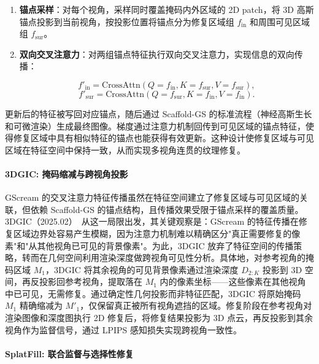 \begin{enumerate}
\item \textbf{锚点采样}：对每个视角，采样同时覆盖掩码内外区域的 2D patch，将 3D 高斯锚点投影到当前视角，按投影位置将锚点分为修复区域组 $f_{\text{in}}$ 和周围可见区域组 $f_{\text{sur}}$。
\item \textbf{双向交叉注意力}：对两组锚点特征执行双向交叉注意力，实现信息的双向传播：

\begin{equation}
f'_{\text{in}} = \text{CrossAttn}(Q=f_{\text{in}}, K=f_{\text{sur}}, V=f_{\text{sur}}),
\end{equation}
\begin{equation}
f'_{\text{sur}} = \text{CrossAttn}(Q=f_{\text{sur}}, K=f_{\text{in}}, V=f_{\text{in}}).
\end{equation}
\end{enumerate}

更新后的特征被写回对应锚点，随后通过 Scaffold-GS 的标准流程（神经高斯生长和可微渲染）生成最终图像。梯度通过注意力机制回传到可见区域的锚点特征，使得修复区域中具有相似特征的锚点也能获得有效更新。这种设计使修复区域与可见区域在特征空间中保持一致，从而实现多视角连贯的纹理修复。

\paragraph{3DGIC: 掩码缩减与跨视角投影}

GScream 的交叉注意力特征传播虽然在特征空间建立了修复区域与可见区域的关联，但依赖 Scaffold-GS 的锚点结构，且传播效果受限于锚点采样的覆盖质量。3DGIC（2025.02）~\cite{2502_11801}从这一局限出发，其关键观察是：GScream 的特征传播在修复区域边界处容易产生模糊，因为注意力机制难以精确区分"真正需要修复的像素"和"从其他视角已可见的背景像素"。为此，3DGIC 放弃了特征空间的传播策略，转而在几何空间利用渲染深度做跨视角可见性分析。具体地，对参考视角的掩码区域 $M_1$，3DGIC 将其余视角的可见背景像素通过渲染深度 $D_{2:K}$ 投影到 3D 空间，再反投影回参考视角，提取落在 $M_1$ 内的像素坐标——这些像素在其他视角中已可见，无需修复。通过确定性几何投影而非特征匹配，3DGIC 将原始掩码 $M_1$ 精确缩减为 $M'_1$，仅保留真正被所有视角遮挡的区域。修复阶段在参考视角对渲染图像和深度图执行 2D 修复后，将修复结果投影为 3D 点云，再反投影到其余视角作为监督信号，通过 LPIPS 感知损失实现跨视角一致性。

\paragraph{SplatFill: 联合监督与选择性修复}

